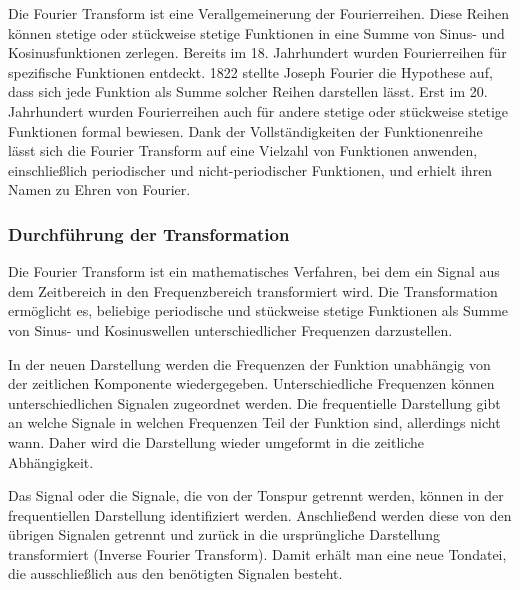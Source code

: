 Die Fourier Transform ist eine Verallgemeinerung der Fourierreihen. Diese Reihen können stetige oder stückweise stetige Funktionen in eine Summe von Sinus- und Kosinusfunktionen zerlegen. Bereits im 18. Jahrhundert wurden Fourierreihen für spezifische Funktionen entdeckt. 1822 stellte Joseph Fourier die Hypothese auf, dass sich jede Funktion als Summe solcher Reihen darstellen lässt. Erst im 20. Jahrhundert wurden Fourierreihen auch für andere stetige oder stückweise stetige Funktionen formal bewiesen. Dank der Vollständigkeiten der Funktionenreihe lässt sich die Fourier Transform auf eine Vielzahl von Funktionen anwenden, einschließlich periodischer und nicht-periodischer Funktionen, und erhielt ihren Namen zu Ehren von Fourier.

\par

\subsubsection{Durchführung der Transformation}

Die Fourier Transform ist ein mathematisches Verfahren, bei dem ein Signal aus dem Zeitbereich in den Frequenzbereich transformiert wird. Die Transformation ermöglicht es, beliebige periodische und stückweise stetige Funktionen als Summe von Sinus- und Kosinuswellen unterschiedlicher Frequenzen darzustellen.

\par

 
\par

In der neuen Darstellung werden die Frequenzen der Funktion unabhängig von der zeitlichen Komponente wiedergegeben. Unterschiedliche Frequenzen können unterschiedlichen Signalen zugeordnet werden. Die frequentielle Darstellung gibt an welche Signale in welchen Frequenzen Teil der Funktion sind, allerdings nicht wann. Daher wird die Darstellung wieder umgeformt in die zeitliche Abhängigkeit.

\par

Das Signal oder die Signale, die von der Tonspur getrennt werden, können in der frequentiellen Darstellung identifiziert werden. Anschließend werden diese von den übrigen Signalen getrennt und zurück in die ursprüngliche Darstellung transformiert (Inverse Fourier Transform). Damit erhält man eine neue Tondatei, die ausschließlich aus den benötigten Signalen besteht.

